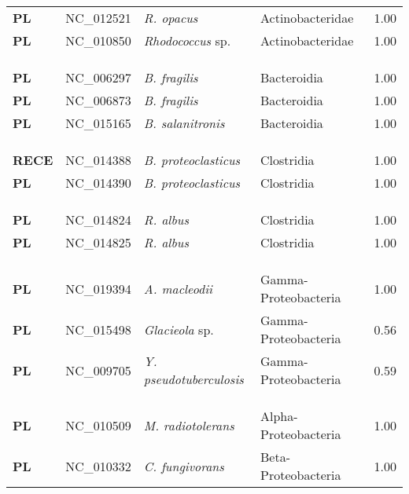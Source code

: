 \begin{adjustwidth}{-3cm}{2cm}
{\begin{supertabular}{>{\bfseries}l|p{0.1\textwidth}p{0.14\textwidth}l|l}
PL & NC\_012521 & \textit{R. opacus} & Actinobacteridae & 1.00\\
PL & NC\_010850 & \textit{Rhodococcus} sp. & Actinobacteridae & 1.00\\
\\
\\
\hline\\
PL & NC\_006297 & \textit{B. fragilis} & Bacteroidia & 1.00\\
PL & NC\_006873 & \textit{B. fragilis} & Bacteroidia & 1.00\\
PL & NC\_015165 & \textit{B. salanitronis} & Bacteroidia & 1.00\\
\\
\\
\hline\\
RECE & NC\_014388 & \textit{B. proteoclasticus} & Clostridia & 1.00\\
PL & NC\_014390 & \textit{B. proteoclasticus} & Clostridia & 1.00\\
\\
\\
\hline\\
PL & NC\_014824 & \textit{R. albus} & Clostridia & 1.00\\
PL & NC\_014825 & \textit{R. albus} & Clostridia & 1.00\\
\\
\\
\hline\\
PL & NC\_019394 & \textit{A. macleodii} & Gamma-Proteobacteria & 1.00\\
PL & NC\_015498 & \textit{Glacieola} sp. & Gamma-Proteobacteria & 0.56\\
PL & NC\_009705 & \textit{Y. pseudotuberculosis} & Gamma-Proteobacteria & 0.59\\
\\
\\
\hline\\
PL & NC\_010509 & \textit{M. radiotolerans} & Alpha-Proteobacteria & 1.00\\
PL & NC\_010332 & \textit{C. fungivorans} & Beta-Proteobacteria & 1.00\\

\end{supertabular}}
\end{adjustwidth}
